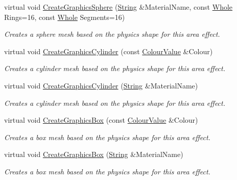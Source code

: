 \begin{DoxyCompactItemize}
virtual void \hyperlink{classphys_1_1AreaEffect_ae2640c1eb9e05e4db0c4544d31aa2c0c}{CreateGraphicsSphere} (\hyperlink{namespacephys_aa03900411993de7fbfec4789bc1d392e}{String} \&MaterialName, const \hyperlink{namespacephys_a460f6bc24c8dd347b05e0366ae34f34a}{Whole} Rings=16, const \hyperlink{namespacephys_a460f6bc24c8dd347b05e0366ae34f34a}{Whole} Segments=16)
\begin{DoxyCompactList}\small\item\em Creates a sphere mesh based on the physics shape for this area effect. \item\end{DoxyCompactList}\item 
virtual void \hyperlink{classphys_1_1AreaEffect_af9a44284ceb691fdd21e4fc01811f04d}{CreateGraphicsCylinder} (const \hyperlink{classphys_1_1ColourValue}{ColourValue} \&Colour)
\begin{DoxyCompactList}\small\item\em Creates a cylinder mesh based on the physics shape for this area effect. \item\end{DoxyCompactList}\item 
virtual void \hyperlink{classphys_1_1AreaEffect_ae954c00e62d7ee883148f1990d0d0a48}{CreateGraphicsCylinder} (\hyperlink{namespacephys_aa03900411993de7fbfec4789bc1d392e}{String} \&MaterialName)
\begin{DoxyCompactList}\small\item\em Creates a cylinder mesh based on the physics shape for this area effect. \item\end{DoxyCompactList}\item 
virtual void \hyperlink{classphys_1_1AreaEffect_a12655c60d5461ef6053c8bdd5cc9afea}{CreateGraphicsBox} (const \hyperlink{classphys_1_1ColourValue}{ColourValue} \&Colour)
\begin{DoxyCompactList}\small\item\em Creates a box mesh based on the physics shape for this area effect. \item\end{DoxyCompactList}\item 
virtual void \hyperlink{classphys_1_1AreaEffect_afa5456c457c8fa61bd3ea5d83f3296a4}{CreateGraphicsBox} (\hyperlink{namespacephys_aa03900411993de7fbfec4789bc1d392e}{String} \&MaterialName)
\begin{DoxyCompactList}\small\item\em Creates a box mesh based on the physics shape for this area effect. \item\end{DoxyCompactList}\item 

\end{DoxyCompactItemize}
